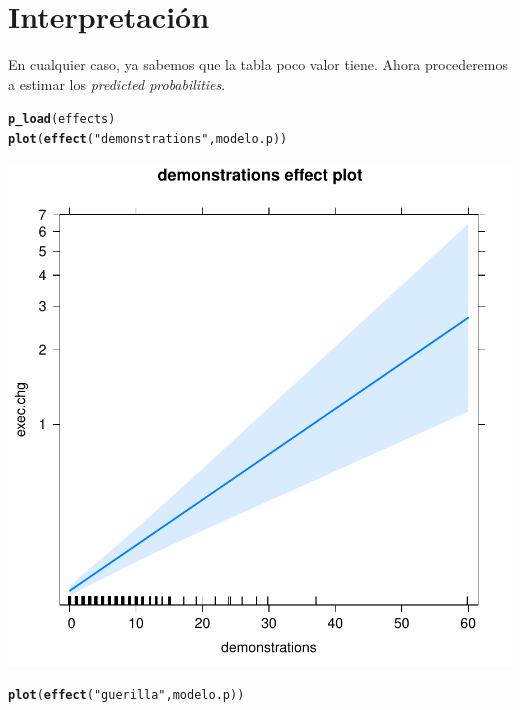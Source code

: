\documentclass[onesided]{article}\usepackage[]{graphicx}\usepackage[]{color}
\makeatletter
\def\maxwidth{ %
  \ifdim\Gin@nat@width>\linewidth
    \linewidth
  \else
    \Gin@nat@width
  \fi
}
\newcommand{\hlstr}[1]{\textcolor[rgb]{0.192,0.494,0.8}{#1}}%
\newcommand{\hlstd}[1]{\textcolor[rgb]{0.345,0.345,0.345}{#1}}%
\newcommand{\hlkwd}[1]{\textcolor[rgb]{0.737,0.353,0.396}{\textbf{#1}}}%
\newenvironment{kframe}{%
 \def\at@end@of@kframe{}%
 \ifinner\ifhmode%
  \def\at@end@of@kframe{\end{minipage}}%
  \begin{minipage}{\columnwidth}%
 \fi\fi%
 \def\FrameCommand##1{\hskip\@totalleftmargin \hskip-\fboxsep
 \colorbox{shadecolor}{##1}\hskip-\fboxsep
     \hskip-\linewidth \hskip-\@totalleftmargin \hskip\columnwidth}%
 \MakeFramed {\advance\hsize-\width
   \@totalleftmargin\z@ \linewidth\hsize
   \@setminipage}}%
 {\par\unskip\endMakeFramed%
 \at@end@of@kframe}
\makeatother
\begin{document}
\section{Interpretaci\'on} 

En cualquier caso, ya sabemos que la tabla poco valor tiene. Ahora procederemos a estimar los \emph{predicted probabilities}.


\begin{kframe}
\begin{alltt}
\hlkwd{p_load}\hlstd{(effects)}
\hlkwd{plot}\hlstd{(}\hlkwd{effect}\hlstd{(}\hlstr{"demonstrations"}\hlstd{, modelo.p))}
\end{alltt}
\end{kframe}

{\centering \includegraphics[width=\maxwidth]{figure/pp-1} 

}


\begin{kframe}\begin{alltt}
\hlkwd{plot}\hlstd{(}\hlkwd{effect}\hlstd{(}\hlstr{"guerilla"}\hlstd{, modelo.p))}
\end{alltt}
\end{kframe}
\end{document}
